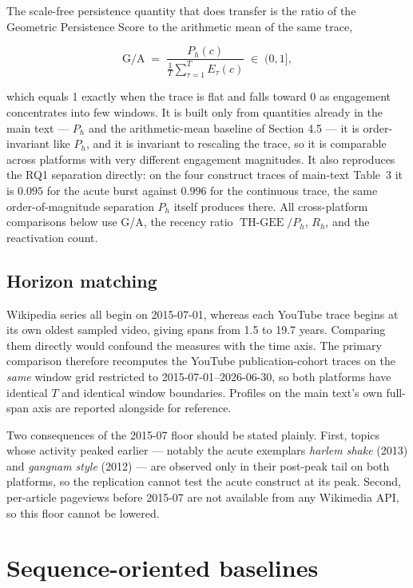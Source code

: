 \documentclass[11pt]{article}
\newcommand{\THGEE}{\operatorname{TH\mbox{-}GEE}}
\begin{document}
The scale-free persistence quantity that does transfer is the ratio of the
Geometric Persistence Score to the arithmetic mean of the same trace,

\begin{equation}
\mathrm{G/A} \;=\; \frac{P_h(c)}{\frac{1}{T}\sum_{\tau=1}^{T} E_{\tau}(c)}
\;\in\; (0,1],
\label{eq:or1_ga}
\end{equation}

which equals 1 exactly when the trace is flat and falls toward 0 as engagement
concentrates into few windows. It is built only from quantities already in the
main text --- $P_h$ and the arithmetic-mean baseline of Section 4.5 --- it is
order-invariant like $P_h$, and it is invariant to rescaling the trace, so it is
comparable across platforms with very different engagement magnitudes. It also
reproduces the RQ1 separation directly: on the four construct traces of main-text
Table~3 it is $0.095$ for the acute burst against $0.996$ for the continuous
trace, the same order-of-magnitude separation $P_h$ itself produces there. All
cross-platform comparisons below use G/A, the recency ratio $\THGEE/P_h$, $R_h$,
and the reactivation count.

\subsection{Horizon matching}
\label{sec:or1_horizon}

Wikipedia series all begin on 2015-07-01, whereas each YouTube trace begins at
its own oldest sampled video, giving spans from 1.5 to 19.7 years. Comparing them
directly would confound the measures with the time axis. The primary comparison
therefore recomputes the YouTube publication-cohort traces on the \emph{same}
window grid restricted to 2015-07-01--2026-06-30, so both platforms have
identical $T$ and identical window boundaries. Profiles on the main text's own
full-span axis are reported alongside for reference.

Two consequences of the 2015-07 floor should be stated plainly. First, topics
whose activity peaked earlier --- notably the acute exemplars \emph{harlem shake}
(2013) and \emph{gangnam style} (2012) --- are observed only in their post-peak
tail on both platforms, so the replication cannot test the acute construct at its
peak. Second, per-article pageviews before 2015-07 are not available from any
Wikimedia API, so this floor cannot be lowered.

\section{Sequence-oriented baselines}
\label{sec:or1_baselines}
\end{document}
